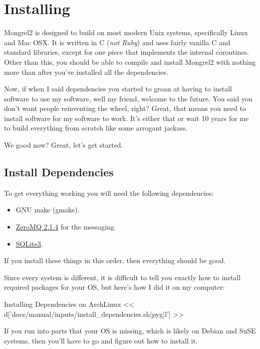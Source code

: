 \chapter{Installing}

Mongrel2 is designed to build on most modern Unix systems, specifically Linux
and Mac OSX.  It is written in C (\emph{not Ruby}) and uses fairly vanilla
C and standard libraries, except for one piece that implements the internal
coroutines.  Other than this, you should be able to compile and install Mongrel2
with nothing more than  after you've installed
all the dependencies.

Now, if when I said dependencies you started to groan at having to install
software to use my software, well my friend, welcome to the future.  You
said you don't want people reinventing the wheel, right?  Great, that means
you need to install software for my software to work.  It's either that or
wait 10 years for me to build everything from scratch like some arrogant
jackass.

We good now?  Great, let's get started.

\section{Install Dependencies}

To get everything working you will need the following dependencies:

\begin{itemize}
\item GNU make (gmake).
\item \href{http://zeromq.org}{ZeroMQ 2.1.4} for the messaging.
\item \href{http://www.sqlite.org/}{SQLite3}.
\end{itemize}

If you install these things in this order, then everything should be good.

Since every system is different, it is difficult to tell you exactly how to
install required packages for your OS, but here's how I did it on my computer:

\begin{code}{Installing Dependencies on ArchLinux}
<< d['docs/manual/inputs/install_dependencies.sh|pyg|l'] >>
\end{code}

If you run into parts that your OS is missing, which is likely on
Debian and SuSE systems, then you'll have to go and figure out
how to install it.

